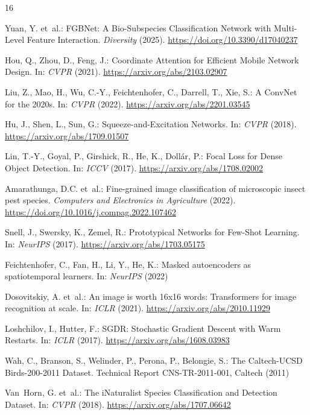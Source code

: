\documentclass[runningheads]{llncs}
\begin{document}
\begin{thebibliography}{16}

Yuan, Y. et~al.: FGBNet: A Bio-Subspecies Classification Network with Multi-Level Feature Interaction. \emph{Diversity} (2025). \url{https://doi.org/10.3390/d17040237}

Hou, Q., Zhou, D., Feng, J.: Coordinate Attention for Efficient Mobile Network Design. In: \emph{CVPR} (2021). \url{https://arxiv.org/abs/2103.02907}

Liu, Z., Mao, H., Wu, C.-Y., Feichtenhofer, C., Darrell, T., Xie, S.: A ConvNet for the 2020s. In: \emph{CVPR} (2022). \url{https://arxiv.org/abs/2201.03545}

Hu, J., Shen, L., Sun, G.: Squeeze-and-Excitation Networks. In: \emph{CVPR} (2018). \url{https://arxiv.org/abs/1709.01507}

Lin, T.-Y., Goyal, P., Girshick, R., He, K., Doll\'{a}r, P.: Focal Loss for Dense Object Detection. In: \emph{ICCV} (2017). \url{https://arxiv.org/abs/1708.02002}

Amarathunga, D.C. et~al.: Fine-grained image classification of microscopic insect pest species. \emph{Computers and Electronics in Agriculture} (2022). \url{https://doi.org/10.1016/j.compag.2022.107462}

Snell, J., Swersky, K., Zemel, R.: Prototypical Networks for Few-Shot Learning. In: \emph{NeurIPS} (2017). \url{https://arxiv.org/abs/1703.05175}

Feichtenhofer, C., Fan, H., Li, Y., He, K.: Masked autoencoders as spatiotemporal learners. In: \emph{NeurIPS} (2022)

Dosovitskiy, A. et~al.: An image is worth 16x16 words: Transformers for image recognition at scale. In: \emph{ICLR} (2021). \url{https://arxiv.org/abs/2010.11929}

Loshchilov, I., Hutter, F.: SGDR: Stochastic Gradient Descent with Warm Restarts. In: \emph{ICLR} (2017). \url{https://arxiv.org/abs/1608.03983}

Wah, C., Branson, S., Welinder, P., Perona, P., Belongie, S.: The Caltech-UCSD Birds-200-2011 Dataset. Technical Report CNS-TR-2011-001, Caltech (2011)

Van~Horn, G. et~al.: The iNaturalist Species Classification and Detection Dataset. In: \emph{CVPR} (2018). \url{https://arxiv.org/abs/1707.06642}


\end{thebibliography}
\end{document}
